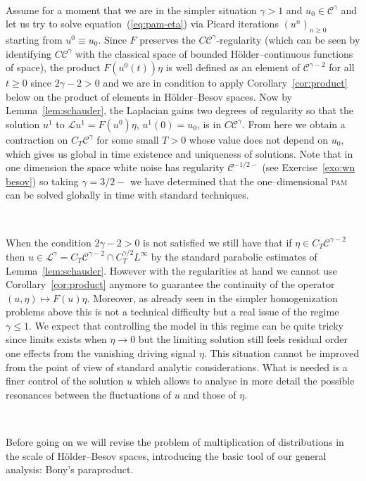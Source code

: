 \documentclass[a4paper,11pt]{article}
\newcommand{\tmname}[1]{\textsc{#1}}
\newcommand{\LL}{\mathscr{L}}
\newcommand{\CC}{\mathscr{C}}
\begin{document}
\

Assume for a moment that we are in the simpler situation $\gamma > 1$ and
$u_0 \in \CC^{\gamma}$ and let us try to solve equation~(\ref{eq:pam-eta}) via
Picard iterations $(u^n)_{n \geqslant 0}$ starting from $u^0 \equiv u_0$.
Since $F$ preserves the $C \CC^{\gamma}$-regularity (which can be seen by
identifying $C \CC^{\gamma}$ with the classical space of bounded
H{\"o}lder--continuous functions of space), the product $F (u^0 (t)) \eta$ is
well defined as an element of $\CC^{\gamma - 2}$ for all $t \geqslant 0$ since
$2 \gamma - 2 > 0$ and we are in condition to apply
Corollary~\ref{cor:product} below on the product of elements in
H{\"o}lder--Besov spaces. Now by Lemma~\ref{lem:schauder}, the Laplacian gains
two degrees of regularity so that the solution $u^1$ to $\LL u^1 = F (u^0)
\eta$, $u^1 (0) = u_0$, is in $C \CC^{\gamma}$. From here we obtain a
contraction on $C_T \CC^{\gamma}$ for some small $T > 0$ whose value does not
depend on $u_0$, which gives us global in time existence and uniqueness of
solutions. Note that in one dimension the space white noise has regularity
$\CC^{- 1 / 2 -}$ (see Exercise~\ref{exo:wn besov}) so taking $\gamma = 3 / 2
-$ we have determined that the one--dimensional {\tmname{pam}} can be solved
globally in time with standard techniques.

\

When the condition $2 \gamma - 2 > 0$ is not satisfied we still have that if
$\eta \in C_T \CC^{\gamma - 2}$ then $u \in \LL^{\gamma} = C_T \CC^{\gamma -
2} \cap C_T^{\gamma / 2} L^{\infty}$ by the standard parabolic estimates of
Lemma~\ref{lem:schauder}. However with the regularities at hand we cannot use
Corollary~\ref{cor:product} anymore to guarantee the continuity of the
operator $(u, \eta) \mapsto F (u) \eta$. Moreover, as already seen in the
simpler homogenization problems above this is not a technical difficulty but a
real issue of the regime $\gamma \leqslant 1$. We expect that controlling the
model in this regime can be quite tricky since limits exists when $\eta
\rightarrow 0$ but the limiting solution still feels residual order one
effects from the vanishing driving signal $\eta$. This situation cannot be
improved from the point of view of standard analytic considerations. What is
needed is a finer control of the solution $u$ which allows to analyse in more
detail the possible resonances between the fluctuations of $u$ and those of
$\eta$.

\

Before going on we will revise the problem of multiplication of distributions
in the scale of H{\"o}lder--Besov spaces, introducing the basic tool of our
general analysis: Bony's paraproduct.
\end{document}
